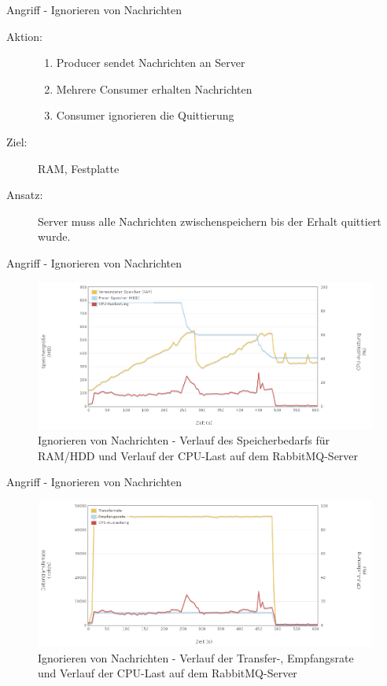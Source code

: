 \documentclass[10pt]{beamer}
\begin{document}
\begin{frame}[t]{Angriff - Ignorieren von Nachrichten}
\begin{description}
	\item[Aktion:]
		\begin{enumerate}
			\item Producer sendet Nachrichten an Server
			\item Mehrere Consumer erhalten Nachrichten
			\item Consumer ignorieren die Quittierung
		\end{enumerate} \smallskip
	\item[Ziel:] RAM, Festplatte
	\item[Ansatz:] Server muss alle Nachrichten zwischenspeichern bis der Erhalt quittiert wurde.
\end{description}
\end{frame}

\begin{frame}{Angriff - Ignorieren von Nachrichten}
\begin{figure}[!htb]
	\centering
	\includegraphics[width=\textwidth]{img/no/no_server1.png}
	\caption{\centering Ignorieren von Nachrichten - Verlauf des Speicherbedarfs für RAM/HDD und Verlauf der CPU-Last auf dem RabbitMQ-Server}
	\label{fig:no-server1}
\end{figure}	
\end{frame}

\begin{frame}{Angriff - Ignorieren von Nachrichten}	
\begin{figure}[!htb]
	\centering
	\includegraphics[width=\textwidth]{img/no/no_server2.png}
	\caption{\centering Ignorieren von Nachrichten - Verlauf der Transfer-, Empfangsrate und Verlauf der CPU-Last auf dem RabbitMQ-Server}
	\label{fig:no-server2}
\end{figure}		
\end{frame}
\end{document}
